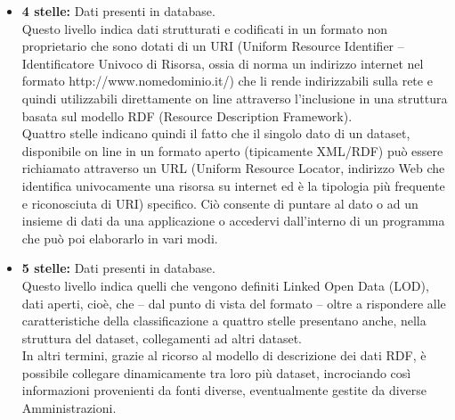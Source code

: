 \documentclass{article}
\theoremstyle{plain}
\theoremstyle{definition}
\begin{document}
\begin{itemize}
\item \textbf{4 stelle:} Dati presenti in database.
\\
Questo livello indica dati strutturati e codificati in un formato non proprietario che sono dotati di un URI (Uniform Resource Identifier – Identificatore Univoco di Risorsa, ossia di norma un indirizzo internet nel formato http://www.nomedominio.it/) che li rende indirizzabili sulla rete e quindi utilizzabili direttamente on line attraverso l'inclusione in una struttura basata sul modello RDF (Resource Description Framework). 
\\
Quattro stelle indicano quindi il fatto che il singolo dato di un dataset, disponibile on line in un formato aperto (tipicamente XML/RDF) può essere richiamato attraverso un URL (Uniform Resource Locator, indirizzo Web che identifica univocamente una risorsa su internet ed è la tipologia più frequente e riconosciuta di URI) specifico. Ciò consente di puntare al dato o ad un insieme di dati da una applicazione o accedervi dall'interno di un programma che può poi elaborarlo in vari modi.

\item \textbf{5 stelle:} Dati presenti in database. 
\\
Questo livello indica quelli che vengono definiti Linked Open Data (LOD), dati aperti, cioè, che – dal punto di vista del formato – oltre a rispondere alle caratteristiche della classificazione a quattro stelle presentano anche, nella struttura del dataset, collegamenti ad altri dataset. 
\\
In altri termini, grazie al ricorso al modello di descrizione dei dati RDF, è possibile collegare dinamicamente tra loro più dataset, incrociando così informazioni provenienti da fonti diverse, eventualmente gestite da diverse Amministrazioni.
\end{itemize}
\phantom
\\

\newpage
\end{document}
